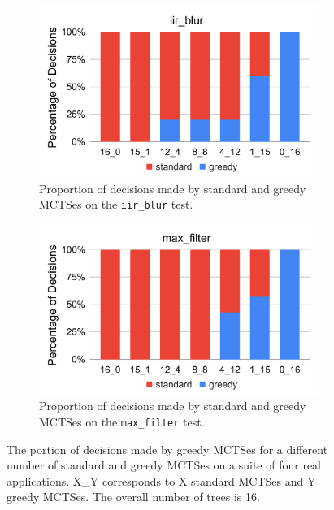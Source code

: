 \begin{figure}[!t]
    \begin{subfigure}[t]{0.45\textwidth}
        \centering
        \includegraphics[width=\textwidth]{figures/iir_blur_random_to_greedy_ratio.pdf}
        \caption{Proportion of decisions made by standard and greedy MCTSes on the \texttt{iir\_blur} test.}
    \end{subfigure}
    \hspace{0.05\textwidth}
    \begin{subfigure}[t]{0.45\textwidth}
        \centering
        \includegraphics[width=\textwidth]{figures/max_filter_random_to_greedy_ratio.pdf}
        \caption{Proportion of decisions made by standard and greedy MCTSes on the \texttt{max\_filter} test.}
    \end{subfigure}
  
  \caption{The portion of decisions made by greedy MCTSes for a different number of standard and greedy MCTSes on a suite of four real applications. X\_Y corresponds to X standard MCTSes and Y greedy MCTSes. The overall number of trees is 16.}
  
  \label{fig:random_greedy_ratio}
\end{figure}

